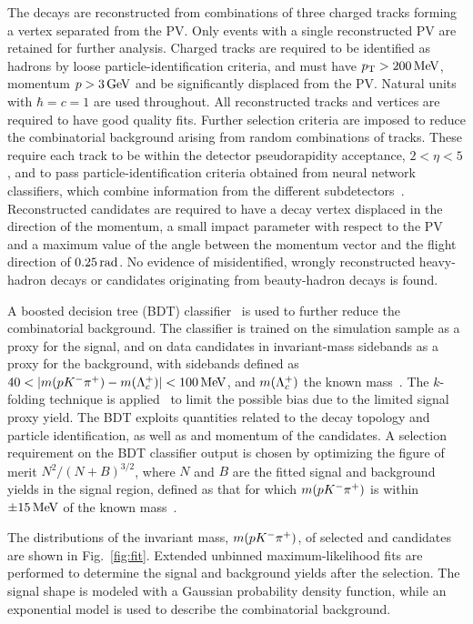 The \Lcpkpi decays are reconstructed from combinations of three charged tracks forming a vertex separated from the PV. Only events with a single reconstructed PV are retained for further analysis. Charged tracks are required to be identified as hadrons by loose particle-identification criteria, and must have $p_{\mathrm{T}}>200\text{\,Me\kern -0.1em V}$, momentum $p>3\text{\,Ge\kern -0.1em V}$ and be significantly displaced from the PV.
Natural units with $\hbar = c = 1$ are used throughout.
All reconstructed tracks and vertices are required to have good quality fits.
Further selection criteria are imposed to reduce the combinatorial background arising from random combinations of tracks. These require each track to be within the \lhcb detector pseudorapidity acceptance, $2<\eta<5$, and to pass particle-identification criteria obtained from neural network classifiers, which combine information from the different subdetectors~\cite{LHCb-DP-2018-001}. Reconstructed \Lc candidates are required to have a decay vertex displaced in the direction of the momentum, a small impact parameter with respect to the PV and a maximum value of the angle between the momentum vector and the flight direction of $0.25 \text{\,rad}$.
No evidence of misidentified, wrongly reconstructed heavy-hadron decays or candidates originating from beauty-hadron decays is found.

A boosted decision tree (BDT) classifier~\cite{Breiman} is used to further reduce the combinatorial background. The classifier is trained on the \Lcpkpi simulation sample as a proxy for the signal, and on data candidates in invariant-mass sidebands as a proxy for the background, with sidebands defined as $40 < |m({p}{{K}^-}{{\pi}^+}) - m({{\Lambda}^+_{c}})| <100\text{\,Me\kern -0.1em V}$, and $m({{\Lambda}^+_{c}})$ the known \Lc mass~\cite{PDG2024}. The $k$-folding technique is applied~\cite{kFold}  to limit the possible bias due to the limited signal proxy yield.
The BDT exploits quantities related to the decay topology and particle identification, as well as \pt and momentum of the \Lc candidates. A selection requirement on the BDT classifier output is chosen by optimizing the figure of merit $N^2/(N+B)^{3/2}$, where $N$ and $B$ are the fitted signal and background yields in the signal region, defined as that for which $m({p}{{K}^-}{{\pi}^+})$ is within $\pm 15\text{\,Me\kern -0.1em V}$ of the known \Lc mass~\cite{PDG2024}.

The distributions of the invariant mass, $m({p}{{K}^-}{{\pi}^+})$, of selected \Lc and \Lcbar candidates are shown in Fig.~\ref{fig:fit}.
Extended unbinned maximum-likelihood fits are performed to determine the signal and background yields after the selection. The signal shape is modeled with a Gaussian probability density function, while an exponential model is used to describe the combinatorial background.

